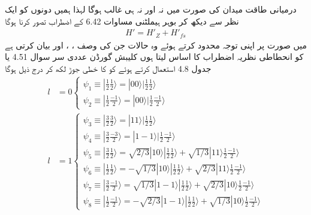 درمیانی طاقت میدان کی صورت میں نہ  اور نہ ہی  غالب ہوگا لہذا ہمیں دونوں کو ایک نظر سے دیکھ کر بوہر ہیملٹنی مساوات 6.42 کے اضطراب تصور کرنا ہوگا 
\begin{align}
H' = H'_Z + H'_{fs}
\end{align}
میں  صورت پر اپنی توجہ محدود کرتے ہوئے وہ حالات جن کی وصف ، ، اور  بیان کرتی ہے کو انحطاطی نظریہ اضطراب کا اساس لیتا ہوں كليبش گورڈن عددی سر سوال 4.51 یا جدول 4.8 استعمال کرتے ہوئے  کو  کا خطی جوڑ لکھ کر درج ذیل ہوگا 
\begin{align*}
l &= 0
\begin{cases}
\psi_1 \equiv | \frac{1}{2} \frac{1}{2} \rangle = | 00 \rangle | \frac{1}{2} \frac{1}{2} \rangle \\
\psi_2 \equiv | \frac{1}{2} \frac{-1}{2} \rangle = | 00 \rangle | \frac{1}{2} \frac{-1}{2} \rangle
\end{cases} \\
l &= 1
\begin{cases}
\psi_3 \equiv | \frac{3}{2} \frac{3}{2} \rangle = | 11 \rangle | \frac{1}{2} \frac{1}{2} \rangle \\
\psi_4 \equiv | \frac{3}{2} \frac{-3}{2} \rangle = | 1 - 1 \rangle | \frac{1}{2} \frac{-1}{2} \rangle \\
\psi_5 \equiv | \frac{3}{2} \frac{1}{2} \rangle = \sqrt{2/3}| 10 \rangle | \frac{1}{2} \frac{1}{2} \rangle + \sqrt{1/3} | 11 \rangle \frac{1}{2} \frac{-1}{2} \rangle \\
\psi_6 \equiv | \frac{1}{2} \frac{1}{2} \rangle = - \sqrt{1/3} | 10 \rangle | \frac{1}{2} \frac{1}{2} \rangle + \sqrt{2/3} | 11 \rangle \frac{1}{2} \frac{-1}{2} \rangle \\
\psi_7 \equiv | \frac{3}{2} \frac{-1}{2} \rangle = \sqrt{1/3} | 1 - 1 \rangle | \frac{1}{2} \frac{1}{2} \rangle + \sqrt{2/3} | 10 \rangle \frac{1}{2} \frac{-1}{2} \rangle \\
\psi_8 \equiv | \frac{1}{2} \frac{-1}{2} \rangle = - \sqrt{2/3} | 1 - 1 \rangle | \frac{1}{2} \frac{1}{2} \rangle + \sqrt{1/3} | 10 \rangle \frac{1}{2} \frac{-1}{2} \rangle
\end{cases}
\end{align*}

